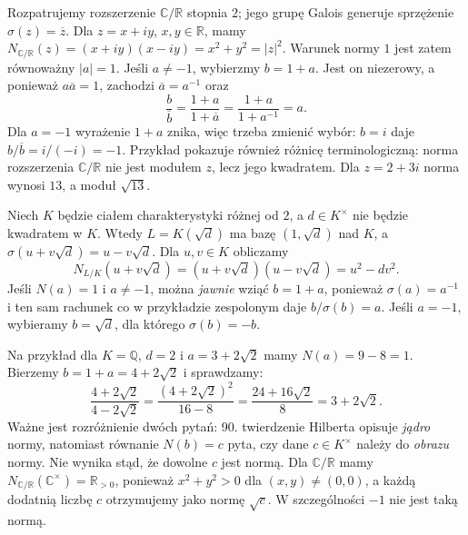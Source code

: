 \begin{przyklad}\label{aa:prz:hilbert90-complex}
Rozpatrujemy rozszerzenie $\mathbb C/\mathbb R$ stopnia $2$;
jego grupę Galois generuje sprzężenie $\sigma(z)=\overline z$.
Dla $z=x+iy$, $x,y\in\mathbb R$, mamy
$N_{\mathbb C/\mathbb R}(z)=(x+iy)(x-iy)=x^2+y^2=|z|^2$.
Warunek normy $1$ jest zatem równoważny $|a|=1$.
Jeśli $a\neq-1$, wybierzmy $b=1+a$. Jest on niezerowy, a ponieważ
$a\overline a=1$, zachodzi $\overline a=a^{-1}$ oraz
\[
\frac{b}{\overline b}
=\frac{1+a}{1+\overline a}
=\frac{1+a}{1+a^{-1}}=a.
\]
Dla $a=-1$ wyrażenie $1+a$ znika, więc trzeba zmienić wybór:
$b=i$ daje $b/\overline b=i/(-i)=-1$.
Przykład pokazuje również różnicę terminologiczną: norma
rozszerzenia $\mathbb C/\mathbb R$ nie jest modułem $z$, lecz
jego kwadratem. Dla $z=2+3i$ norma wynosi $13$, a moduł $\sqrt{13}$.
\end{przyklad}

\begin{przyklad}\label{aa:prz:hilbert90-quadratic}
Niech $K$ będzie ciałem charakterystyki różnej od $2$, a
$d\in K^\times$ nie będzie kwadratem w $K$. Wtedy
$L=K(\sqrt d)$ ma bazę $(1,\sqrt d)$ nad $K$, a
$\sigma(u+v\sqrt d)=u-v\sqrt d$. Dla $u,v\in K$ obliczamy
\[
N_{L/K}(u+v\sqrt d)=(u+v\sqrt d)(u-v\sqrt d)=u^2-dv^2.
\]
Jeśli $N(a)=1$ i $a\neq-1$, można \emph{jawnie} wziąć $b=1+a$,
ponieważ $\sigma(a)=a^{-1}$ i ten sam rachunek co w przykładzie
zespolonym daje $b/\sigma(b)=a$. Jeśli $a=-1$, wybieramy
$b=\sqrt d$, dla którego $\sigma(b)=-b$.

Na przykład dla $K=\mathbb Q$, $d=2$ i $a=3+2\sqrt2$ mamy
$N(a)=9-8=1$. Bierzemy $b=1+a=4+2\sqrt2$ i sprawdzamy:
\[
\frac{4+2\sqrt2}{4-2\sqrt2}
=\frac{(4+2\sqrt2)^2}{16-8}
=\frac{24+16\sqrt2}{8}=3+2\sqrt2.
\]
Ważne jest rozróżnienie dwóch pytań: 90. twierdzenie Hilberta
opisuje \emph{jądro} normy, natomiast równanie $N(b)=c$
pyta, czy dane $c\in K^\times$ należy do \emph{obrazu} normy.
Nie wynika stąd, że dowolne $c$ jest normą.
Dla $\mathbb C/\mathbb R$ mamy
$N_{\mathbb C/\mathbb R}(\mathbb C^\times)=\mathbb R_{>0}$,
ponieważ $x^2+y^2>0$ dla $(x,y)\neq(0,0)$,
a każdą dodatnią liczbę $c$ otrzymujemy jako normę $\sqrt c$.
W szczególności $-1$ nie jest taką normą.
\end{przyklad}

